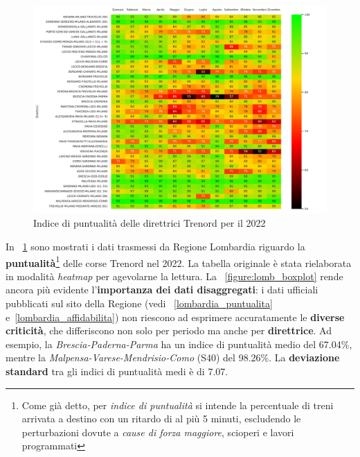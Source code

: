 \documentclass[12pt,a4paper,italian]{report}
\begin{document}
\begin{figure}
    \centering
    \includegraphics[width=1\textwidth]{images/lomb_heatmap.pdf}
    \caption{Indice di puntualità delle direttrici Trenord per il
        2022}
    \label{figure:lomb_heatmap}
\end{figure}

In \figurename~\ref{figure:lomb_heatmap} sono mostrati i dati trasmessi da Regione Lombardia
riguardo la \textbf{puntualità}\footnote{Come già detto, per
    \textit{indice di puntualità} si intende la percentuale di treni
    arrivata a destino con un ritardo di al più 5 minuti, escludendo
    le perturbazioni dovute a \textit{cause di forza maggiore},
    scioperi e lavori programmati} delle corse Trenord nel 2022.  La
tabella originale è stata rielaborata in modalità \textit{heatmap} per
agevolarne la lettura.  La \figurename~\ref{figure:lomb_boxplot} rende
ancora più evidente l'\textbf{importanza dei dati disaggregati}: i
dati ufficiali pubblicati sul sito della Regione (vedi
\figurename~\ref{lombardia_puntualita} e~\ref{lombardia_affidabilita})
non riescono ad esprimere accuratamente le \textbf{diverse criticità},
che differiscono non solo per periodo ma anche per
\textbf{direttrice}.  Ad esempio, la \textit{Brescia-Paderna-Parma} ha
un indice di puntualità medio del 67.04\%, mentre la
\textit{Malpensa-Varese-Mendrisio-Como} (S40) del 98.26\%.  La
\textbf{deviazione standard} tra gli indici di puntualità medi è di
7.07.
\end{document}
